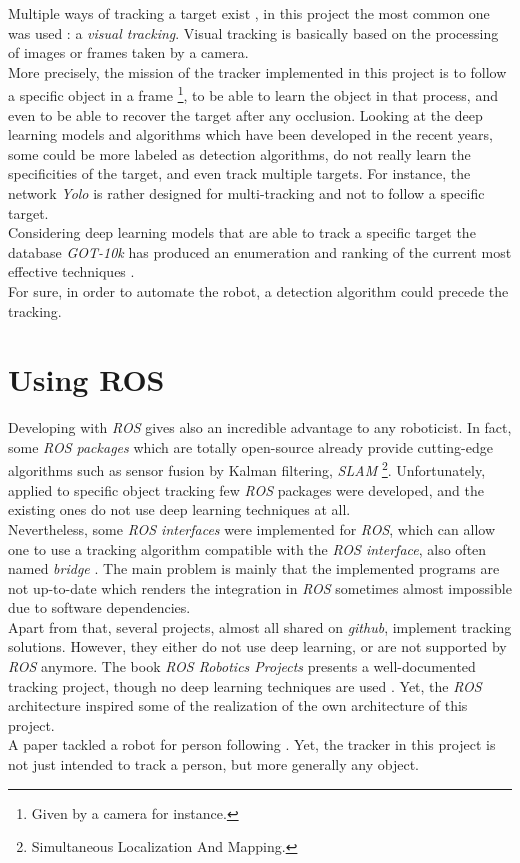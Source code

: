 		Multiple ways of tracking a target exist \cite{learnopencvtracking}, in this project the most
		common one was used : a \textit{visual tracking}. Visual tracking
		is basically based on the processing of images or frames taken by a camera. 
		\\\indent More precisely, the mission of the tracker implemented
		in this project is to follow
		a specific object in a frame
		\footnote{Given by a camera for instance.}, to be able to 
		learn the object in that process, and even to be able to recover the target after 
		any occlusion. Looking at the deep learning models and algorithms 
		which have been developed in the recent years,
		some could be more labeled as detection algorithms, do not really learn the specificities 
		of the target, and even track multiple targets. For instance, the network \textit{Yolo} 
		\cite{bjelonicYolo2018} is rather designed for multi-tracking and 		not to follow a specific target. 
		\\\indent Considering deep learning models that are able to 
		track a specific target the database \textit{GOT-10k} has produced
		an enumeration and ranking of the current most effective techniques \cite{trakinglist}.
		\\\indent For sure, in order to automate the robot, a detection algorithm
		could precede the tracking.
		 
		
		\section{Using ROS}
		
		Developing with \textit{ROS} gives also an incredible
		advantage to any roboticist. In fact, some \textit{ROS packages}
		which are totally open-source already provide cutting-edge algorithms
		such as sensor fusion by Kalman filtering, \textit{SLAM}
		\footnote{Simultaneous Localization And Mapping.}. Unfortunately, 
		applied to specific object tracking few \textit{ROS} packages were developed, and
		the existing ones do not use deep learning techniques at all.
		\\\indent Nevertheless, some \textit{ROS interfaces} were implemented
		for \textit{ROS}, which can allow one to use a tracking algorithm
		compatible with the \textit{ROS interface}, also often named
		\textit{bridge} \cite{mtf}. The main problem is mainly that the implemented
		programs are not up-to-date which renders the integration
		in \textit{ROS} sometimes almost impossible due to software dependencies.
		\\\indent Apart from that, several projects, almost all shared on
		\textit{github}, implement tracking solutions. However, they 
		either do not use deep learning, or are not supported by \textit{ROS} 
		anymore. The book \textit{ROS Robotics Projects} presents
		a well-documented tracking project, though no
		deep learning techniques are used \cite{rosprojects}. Yet, 
		the \textit{ROS} architecture inspired some of the realization 
		of the own architecture of this project.
		\\\indent A paper tackled a robot for person following \cite{personfollowing}.
		Yet, the tracker in this project is not just intended to track a person, 
		but more generally any object.

